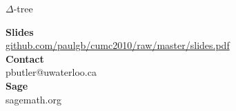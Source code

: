 \documentclass{beamer}
\theoremstyle{definition}
\theoremstyle{definition}
\begin{document}
\begin{frame}{$\Delta$-tree}

\end{frame}

\begin{frame}
{}

\end{frame}


\begin{frame}
\textbf{Slides} \\
\url{github.com/paulgb/cumc2010/raw/master/slides.pdf} \\
\vspace{1.5em}
\textbf{Contact} \\
pbutler@uwaterloo.ca \\
\vspace{1.5em}
\textbf{Sage} \\
sagemath.org
\end{frame}
\end{document}

